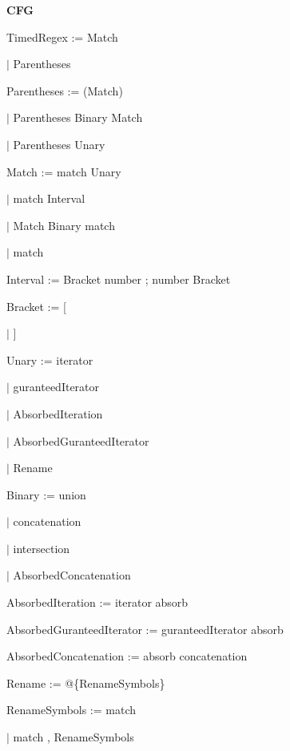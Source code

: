 
\textbf{CFG}

TimedRegex := Match

\qquad	$\mid$ Parentheses

Parentheses := (Match)

\qquad	$\mid$ Parentheses Binary Match

\qquad	$\mid$ Parentheses Unary

Match := match Unary

\qquad	$\mid$ match Interval

\qquad    $\mid$ Match Binary match

\qquad	$\mid$ match

Interval := Bracket number ; number Bracket

Bracket := [

\qquad	$\mid$ ]

Unary := iterator

\qquad	$\mid$ guranteedIterator

\qquad	$\mid$ AbsorbedIteration

\qquad	$\mid$ AbsorbedGuranteedIterator

\qquad	$\mid$ Rename

Binary := union

\qquad	$\mid$ concatenation

\qquad	$\mid$ intersection

\qquad	$\mid$ AbsorbedConcatenation

AbsorbedIteration := iterator absorb 

AbsorbedGuranteedIterator := guranteedIterator absorb 

AbsorbedConcatenation := absorb concatenation

Rename := @\{RenameSymbols\}

RenameSymbols := match

\qquad	$\mid$ match , RenameSymbols